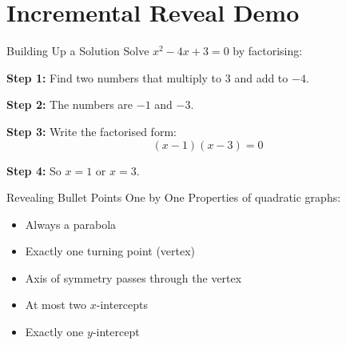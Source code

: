 \documentclass{cherwellmaths}
\begin{document}
\section{Incremental Reveal Demo}

\begin{frame}{Building Up a Solution}
  Solve $x^2 - 4x + 3 = 0$ by factorising:

  \pause
  \textbf{Step 1:} Find two numbers that multiply to $3$ and add to $-4$.

  \pause
  \textbf{Step 2:} The numbers are $-1$ and $-3$.

  \pause
  \textbf{Step 3:} Write the factorised form:
  \[
    (x - 1)(x - 3) = 0
  \]

  \pause
  \textbf{Step 4:} So $x = 1$ or $x = 3$.
\end{frame}

\begin{frame}{Revealing Bullet Points One by One}
  Properties of quadratic graphs:
  \begin{itemize}[<+->]
    \item Always a parabola
    \item Exactly one turning point (vertex)
    \item Axis of symmetry passes through the vertex
    \item At most two $x$-intercepts
    \item Exactly one $y$-intercept
  \end{itemize}
\end{frame}
\end{document}
